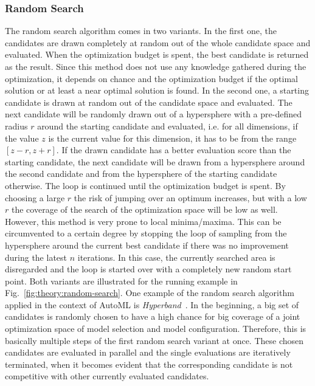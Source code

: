 \subsubsection{Random Search}
\label{sec:theory:optimization:search:random}
The random search algorithm comes in two variants.
In the first one, the candidates are drawn completely at random out of the whole candidate space and evaluated.
When the optimization budget is spent, the best candidate is returned as the result.
Since this method does not use any knowledge gathered during the optimization, it depends on chance and the optimization budget if the optimal solution or at least a near optimal solution is found.\newline
In the second one, a starting candidate is drawn at random out of the candidate space and evaluated.
The next candidate will be randomly drawn out of a hypersphere with a pre-defined radius $r$ around the starting candidate and evaluated, i.e. for all dimensions, if the value $z$ is the current value for this dimension, it has to be from the range $[z-r, z+r]$.
If the drawn candidate has a better evaluation score than the starting candidate, the next candidate will be drawn from a hypersphere around the second candidate and from the hypersphere of the starting candidate otherwise.
The loop is continued until the optimization budget is spent.
By choosing a large $r$ the risk of jumping over an optimum increases, but with a low $r$ the coverage of the search of the optimization space will be low as well.\newline
However, this method is very prone to local minima/maxima.
This can be circumvented to a certain degree by stopping the loop of sampling from the hypersphere around the current best candidate if there was no improvement during the latest $n$ iterations.
In this case, the currently searched area is disregarded and the loop is started over with a completely new random start point.
Both variants are illustrated for the running example in Fig.~\ref{fig:theory:random-search}.\newline
One example of the random search algorithm applied in the context of AutoML is \textit{Hyperband}~\cite{Li-Hyperband}.
In the beginning, a big set of candidates is randomly chosen to have a high chance for big coverage of a joint optimization space of model selection and model configuration.
Therefore, this is basically multiple steps of the first random search variant at once.
These chosen candidates are evaluated in parallel and the single evaluations are iteratively terminated, when it becomes evident that the corresponding candidate is not competitive with other currently evaluated candidates.
